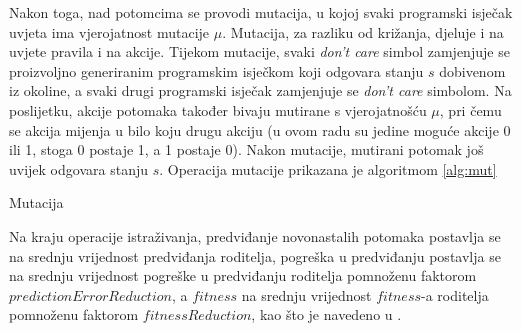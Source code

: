 \documentclass[times, utf8, zavrsni]{fer}
\begin{document}
Nakon toga, nad potomcima se provodi mutacija, u kojoj svaki programski isječak uvjeta ima vjerojatnost mutacije $\mu$.
Mutacija, za razliku od križanja, djeluje i na uvjete pravila i na akcije.
Tijekom mutacije, svaki \emph{don't care} simbol zamjenjuje se proizvoljno generiranim programskim isječkom koji odgovara stanju $s$ dobivenom iz okoline, a svaki drugi programski isječak zamjenjuje se \emph{don't care} simbolom.
Na poslijetku, akcije potomaka također bivaju mutirane s vjerojatnošću $\mu$, pri čemu se akcija mijenja u bilo koju drugu akciju (u ovom radu su jedine moguće akcije 0 ili 1, stoga 0 postaje 1, a 1 postaje 0).
Nakon mutacije, mutirani potomak još uvijek odgovara stanju $s$.
Operacija mutacije prikazana je algoritmom \ref{alg:mut}
\begin{algorithm}[h]
    \caption{Mutacija}
    \label{alg:mut}
    \begin{algorithmic}
        \STATE{$r :=$ proizvoljan decimalni broj iz intervala [0, 1)}
        \REPEAT
        \ELSE
        \ENDIF
        \ENDIF
        \ENDFOR
        \STATE{$r :=$ proizvoljan decimalni broj iz intervala [0, 1)}
        \ENDIF
    \end{algorithmic}
\end{algorithm}

Na kraju operacije istraživanja, predviđanje novonastalih potomaka postavlja se na srednju vrijednost predviđanja roditelja, pogreška u predviđanju postavlja se na srednju vrijednost pogreške u predviđanju roditelja pomnoženu faktorom $predictionErrorReduction$, a $fitness$ na srednju vrijednost $fitness$-a roditelja pomnoženu faktorom $fitnessReduction$, kao što je navedeno u \citep{4}.
\end{document}
